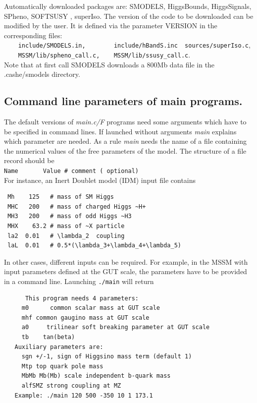 \documentclass[12pt,a4paper]{article}
\begin{document}
Automatically downloaded packages are: SMODELS\cite{Kraml:2014sna}, HiggsBounds\cite{Bechtle:2013wla}, 
HiggsSignals\cite{Bechtle:2013xfa}, SPheno\cite{Porod:2011nf}, SOFTSUSY \cite{Allanach:2001kg},
superIso\cite{Ambrogi:2017neo}.
The version of the code to be downloaded   can be modified by the user. It is defined via the  parameter
VERSION   in the corresponding files:\\
 \verb|    include/SMODELS.in,        include/hBandS.inc  sources/superIso.c|,\\
 \verb|    MSSM/lib/spheno_call.c,    MSSM/lib/ssusy_call.c|.\\
Note that at first call SMODELS downloads a 800Mb data file in the .cashe/smodels directory.


\subsection{Command line parameters of main programs.}
\label{sec:command}
The default versions of {\it main.c/F}  programs need some arguments
which have to be specified in command lines. If launched without
arguments {\it main} explains which parameter are needed. 
As a rule  {\it main}  needs  the name of a file containing the
numerical values of the free parameters of the model. The structure of a file
record should be\\
\verb|Name       Value # comment ( optional)|\\

\noindent
For instance, an Inert Doublet model (IDM) input file contains
\begin{verbatim}
 Mh    125   # mass of SM Higgs 
 MHC   200   # mass of charged Higgs ~H+
 MH3   200   # mass of odd Higgs ~H3
 MHX    63.2 # mass of ~X particle
 la2  0.01   # \lambda_2  coupling
 laL  0.01   # 0.5*(\lambda_3+\lambda_4+\lambda_5)
\end{verbatim}


In other cases, different inputs can be required. For example, in the MSSM with input parameters defined at the GUT scale,
the parameters have to be provided in a command line. Launching \verb|./main| will return 
\begin{verbatim}
      This program needs 4 parameters:
     m0      common scalar mass at GUT scale
     mhf common gaugino mass at GUT scale
     a0     trilinear soft breaking parameter at GUT scale
     tb    tan(beta)
   Auxiliary parameters are:
     sgn +/-1, sign of Higgsino mass term (default 1)
     Mtp top quark pole mass
     MbMb Mb(Mb) scale independent b-quark mass
     alfSMZ strong coupling at MZ
   Example: ./main 120 500 -350 10 1 173.1
\end{verbatim}
\end{document}
